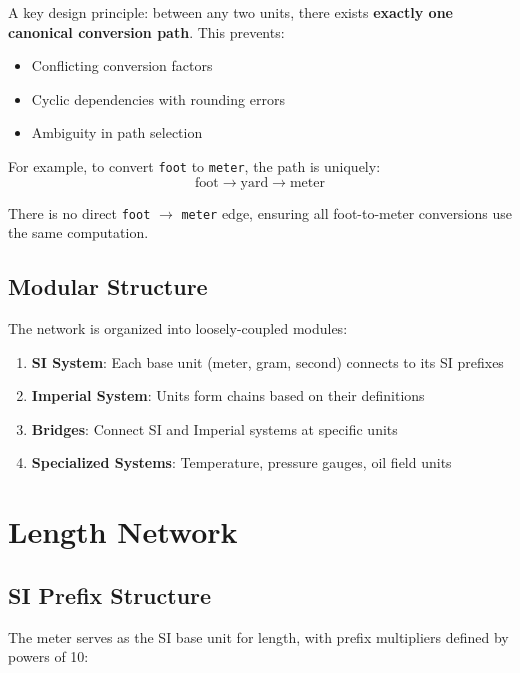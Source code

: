 \documentclass[11pt,a4paper]{report}
\begin{document}
A key design principle: between any two units, there exists \textbf{exactly one canonical conversion path}. This prevents:
\begin{itemize}[leftmargin=*]
  \item Conflicting conversion factors
  \item Cyclic dependencies with rounding errors
  \item Ambiguity in path selection
\end{itemize}

For example, to convert \texttt{foot} to \texttt{meter}, the path is uniquely:
\[
\text{foot} \rightarrow \text{yard} \rightarrow \text{meter}
\]

There is no direct \texttt{foot} $\rightarrow$ \texttt{meter} edge, ensuring all foot-to-meter conversions use the same computation.

\subsection{Modular Structure}

The network is organized into loosely-coupled modules:
\begin{enumerate}[leftmargin=*]
  \item \textbf{SI System}: Each base unit (meter, gram, second) connects to its SI prefixes
  \item \textbf{Imperial System}: Units form chains based on their definitions
  \item \textbf{Bridges}: Connect SI and Imperial systems at specific units
  \item \textbf{Specialized Systems}: Temperature, pressure gauges, oil field units
\end{enumerate}

\section{Length Network}

\subsection{SI Prefix Structure}

The meter serves as the SI base unit for length, with prefix multipliers defined by powers of 10:
\end{document}
